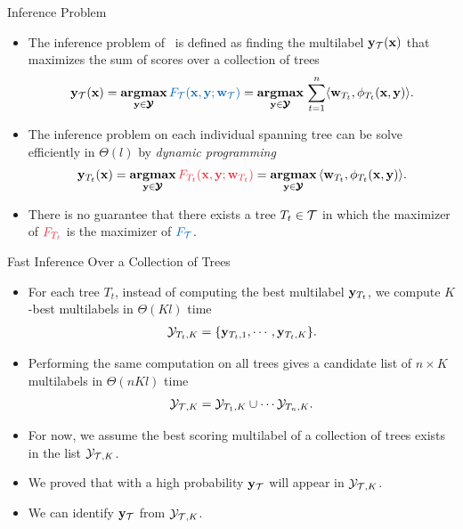 \documentclass[first=dgreen,second=purple,logo=yellowexc]{aaltoslides}
\begin{document}
\begin{frame}{Inference Problem}
	\begin{itemize}
		\item The inference problem of \rta\ is defined as finding the multilabel $\mathbf {y}_{\mathcal{T}}(\mathbf {x})$ that maximizes the sum of scores over a collection of trees
		\begin{align*}
			\vy_{\Tcal}(\vx) = \underset{\vy\in\vYcal}{\argmax}\,{\color{aaltoblue}F_{\Tcal}(\vx,\vy;\vw_{\Tcal})} = \underset{\vy\in\vYcal}{\argmax}\,\sum_{t=1}^{n}\ip{\vw_{T_t}}{\phi_{T_t}(\vx,\vy)}.
		\end{align*}
		\item The inference problem on each individual spanning tree can be solve efficiently in $\Theta(l)$ by \textit{dynamic programming}
		\begin{align*}
			\vy_{T_t}(\vx) = \underset{\vy\in\vYcal}{\argmax}\,{\color{aaltored}F_{T_t}(\vx,\vy;\vw_{T_t})}= \underset{\vy\in\vYcal}{\argmax}\,\ip{\vw_{T_t}}{\phi_{T_t}(\vx,\vy)}.
		\end{align*}
		\item There is no guarantee that there exists a tree $T_t\in\mathcal{T}$ in which the maximizer of ${\color{aaltored}F_{T_t}}$ is the maximizer of ${\color{aaltoblue}F_{\Tcal}}$.
	\end{itemize}
\end{frame}




%
\begin{frame}[allowframebreaks]{Fast Inference Over a Collection of Trees}
	\begin{itemize}
		\item For each tree $T_t$, instead of computing the best multilabel $\mathbf {y}_{T_t}$, we compute $K$-best multilabels in $\Theta(Kl)$ time
		\begin{align*}
			\mathcal{Y}_{T_t,K} = \{\mathbf {y}_{T_t,1},\cdots,\mathbf {y}_{T_t,K}\}.
		\end{align*}
		\item Performing the same computation on all trees gives a candidate list of $n\times K$ multilabels in $\Theta(nKl)$ time
		\begin{align*}
			\mathcal{Y}_{\mathcal{T},K}=\mathcal{Y}_{T_1,K}\cup\cdots\mathcal{Y}_{T_n,K}.
		\end{align*}
		\item For now, we assume the best scoring multilabel of a collection of trees exists in the list $\mathcal{Y}_{\mathcal{T},K}$. 
		\item We proved that with a high probability $\mathbf {y}_{\mathcal{T}}$ will appear in $\mathcal{Y}_{\mathcal{T},K}$.
		\item We can identify $\mathbf {y}_{\mathcal{T}}$ from $\mathcal{Y}_{\mathcal{T},K}$.
	\end{itemize}
\end{frame}
\end{document}
